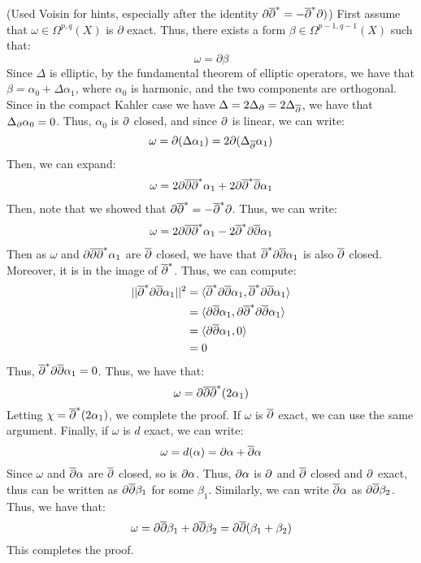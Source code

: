 \documentclass[12pt]{article}
\begin{document}
\begin{solution}
    (Used Voisin for hints, especially after the identity $\partial\overline{\partial}^* = -\overline{\partial}^* \partial)$)
    First assume that $\omega \in \Omega^{p,q}(X)$ is $\partial$ exact. Thus, there exists a form $\beta \in \Omega^{p-1, q-1}(X)$ such that: 
    \[ \omega = \partial\beta\]
    Since $\Delta$ is elliptic, by the fundamental theorem of elliptic operators, we have that $\beta = \alpha_0 + \Delta \alpha_1$, where $\alpha_0$ is harmonic, and the two components are orthogonal. Since in the compact Kahler case we have $\Delta = 2\Delta_{\partial} = 2\Delta_{\overline{\partial}}$, we have that $\Delta_{\partial}\alpha_0 = 0$. Thus, $\alpha_0$ is $\partial$ closed, and since $\partial$ is linear, we can write:
    \[ \omega = \partial(\Delta\alpha_1) = 2\partial(\Delta_{\overline{\partial}} \alpha_1)\]
    Then, we can expand: 
    \begin{align*}
        \omega = 2\partial\overline{\partial}\overline{\partial}^* \alpha_1 + 2\partial\overline{\partial}^* \overline{\partial} \alpha_1
    \end{align*}
    Then, note that we showed that $\partial\overline{\partial}^* = -\overline{\partial}^* \partial$. Thus, we can write:
    \begin{align*}
        \omega = 2\partial\overline{\partial}\overline{\partial}^* \alpha_1 - 2\overline{\partial}^*\partial \overline{\partial} \alpha_1
    \end{align*}
    Then as $\omega$ and $\partial\overline{\partial}\overline{\partial}^* \alpha_1$ are $\overline{\partial}$ closed, we have that $\overline{\partial}^*\partial\overline{\partial} \alpha_1$ is also $\overline{\partial}$ closed. Moreover, it is in the image of $\overline{\partial}^*$. Thus, we can compute:
    \begin{align*}
        ||\overline{\partial}^*\partial\overline{\partial} \alpha_1||^2 &= \langle \overline{\partial}^*\partial\overline{\partial} \alpha_1, \overline{\partial}^*\partial\overline{\partial} \alpha_1\rangle \\
        &= \langle \partial\overline{\partial} \alpha_1, \partial \overline{\partial}^*\partial\overline{\partial} \alpha_1\rangle  \\
        &= \langle \partial\overline{\partial} \alpha_1, 0\rangle \\
        &= 0
    \end{align*}
    Thus, $\overline{\partial}^*\partial\overline{\partial} \alpha_1 = 0$. Thus, we have that:
    \[ \omega = \partial\overline{\partial}\overline{\partial}^* (2\alpha_1)\]
    Letting $\chi = \overline{\partial}^* (2\alpha_1)$, we complete the proof. \bbni
    If $\omega$ is $\overline{\partial}$ exact, we can use the same argument. Finally, if $\omega$ is $d$ exact, we can write: 
    \[ \omega = d(\alpha) = \partial \alpha + \overline{\partial} \alpha \]
    Since $\omega$ and $\overline{\partial} \alpha$ are $\overline{\partial}$ closed, so is $\partial \alpha$. Thus, $\partial \alpha$ is $\partial$ and $\overline{\partial}$ closed and $\partial$ exact, thus can be written as $\partial \overline{\partial} \beta_1$ for some $\beta_1$. Similarly, we can write $\overline{\partial} \alpha$ as $\partial \overline{\partial} \beta_2$. Thus, we have that: 
    \[\omega = \partial\overline{\partial} \beta_1 + \partial\overline{\partial} \beta_2 = \partial\overline{\partial}(\beta_1 + \beta_2) \]
    This completes the proof.
\end{solution}
\newpage
\end{document}
